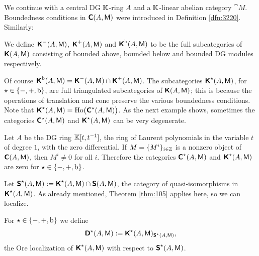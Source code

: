 \label{subsec:bd-in-homot}

We continue with a central DG $\mathbb{K}$-ring $A$ and a $\mathbb{K}$-linear abelian category 
$\cat{M}$. 
Boundedness conditions in $\boldsymbol{\mathsf{C}}(A, \operatorname{\mathsf{M}})$ were introduced in Definition 
\ref{dfn:3220}. Similarly: 

\begin{dfn} \label{dfn:3221}
We define $\boldsymbol{\mathsf{K}}^-(A, \operatorname{\mathsf{M}})$, $\boldsymbol{\mathsf{K}}^+(A, \operatorname{\mathsf{M}})$ and 
$\boldsymbol{\mathsf{K}}^{\mathrm{b}}(A, \operatorname{\mathsf{M}})$ to be the full subcategories of 
$\boldsymbol{\mathsf{K}}(A, \operatorname{\mathsf{M}})$ consisting of bounded above, bounded below and bounded
DG modules respectively. 
\end{dfn}

Of course 
$\boldsymbol{\mathsf{K}}^{\mathrm{b}}(A, \operatorname{\mathsf{M}}) = \boldsymbol{\mathsf{K}}^-(A, \operatorname{\mathsf{M}})
\cap \boldsymbol{\mathsf{K}}^+(A, \operatorname{\mathsf{M}})$.
The subcategories $\boldsymbol{\mathsf{K}}^{\star}(A, \operatorname{\mathsf{M}})$, 
for $\star \in \{ -, +, \mathrm{b} \}$, 
are full triangulated subcategories of $\boldsymbol{\mathsf{K}}(A, \operatorname{\mathsf{M}})$; this is 
because the operations of translation 
and cone preserve the various boundedness conditions. 
Note that 
$\boldsymbol{\mathsf{K}}^{\star}(A, \operatorname{\mathsf{M}}) = 
\operatorname{Ho} \bigl( \boldsymbol{\mathsf{C}}^{\star}(A, \operatorname{\mathsf{M}}) \bigr)$.
As the next example shows, sometimes the categories 
$\boldsymbol{\mathsf{C}}^{\star}(A, \operatorname{\mathsf{M}})$ and 
$\boldsymbol{\mathsf{K}}^{\star}(A, \operatorname{\mathsf{M}})$ can be very degenerate. 

\begin{exa} \label{exa:1460}
Let $A$ be the DG ring $\mathbb{K}[t, t^{-1}]$, the ring of Laurent polynomials in the  
variable $t$ of degree $1$, with the zero differential. If 
$M = \{ M^i \}_{i \in \mathbb{Z}}$ is a nonzero object of 
$\boldsymbol{\mathsf{C}}(A, \operatorname{\mathsf{M}})$, then $M^i \neq 0$ for all $i$. Therefore 
the categories $\boldsymbol{\mathsf{C}}^{\star}(A, \operatorname{\mathsf{M}})$ and 
$\boldsymbol{\mathsf{K}}^{\star}(A, \operatorname{\mathsf{M}})$ are zero for 
$\star \in \{ -, +, \mathrm{b} \}$. 
\end{exa}

Let 
$\boldsymbol{\mathsf{S}}^{\star}(A, \operatorname{\mathsf{M}}) := \boldsymbol{\mathsf{K}}^{\star}(A, \operatorname{\mathsf{M}}) \cap
\boldsymbol{\mathsf{S}}(A, \operatorname{\mathsf{M}})$,
the category of quasi-isomorphisms in $\boldsymbol{\mathsf{K}}^{\star}(A, \operatorname{\mathsf{M}})$. 
As already mentioned, Theorem \ref{thm:105} applies here, so we can 
localize. 

\begin{dfn} \label{dfn:1460}
For $\star \in \{ -, +, \mathrm{b} \}$ we define
\[  \boldsymbol{\mathsf{D}}^{\star}(A, \operatorname{\mathsf{M}}) := 
\boldsymbol{\mathsf{K}}^{\star}(A, \operatorname{\mathsf{M}})_{\boldsymbol{\mathsf{S}}^{\star}(A, \operatorname{\mathsf{M}})} , \]
the Ore localization of $\boldsymbol{\mathsf{K}}^{\star}(A, \operatorname{\mathsf{M}})$ with respect to 
$\boldsymbol{\mathsf{S}}^{\star}(A, \operatorname{\mathsf{M}})$.
\end{dfn}

